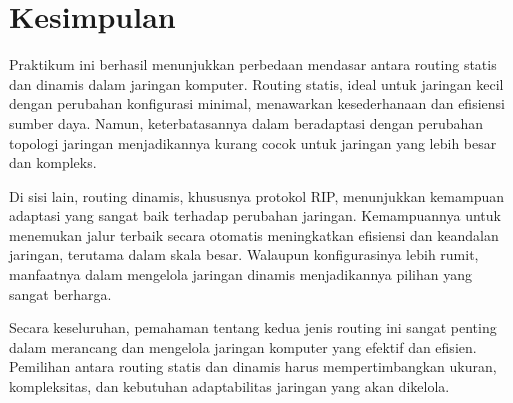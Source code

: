 \section*{Kesimpulan}

Praktikum ini berhasil menunjukkan perbedaan mendasar antara routing statis dan dinamis dalam jaringan komputer. Routing statis, ideal untuk jaringan kecil dengan perubahan konfigurasi minimal, menawarkan kesederhanaan dan efisiensi sumber daya. Namun, keterbatasannya dalam beradaptasi dengan perubahan topologi jaringan menjadikannya kurang cocok untuk jaringan yang lebih besar dan kompleks.

Di sisi lain, routing dinamis, khususnya protokol RIP, menunjukkan kemampuan adaptasi yang sangat baik terhadap perubahan jaringan. Kemampuannya untuk menemukan jalur terbaik secara otomatis meningkatkan efisiensi dan keandalan jaringan, terutama dalam skala besar. Walaupun konfigurasinya lebih rumit, manfaatnya dalam mengelola jaringan dinamis menjadikannya pilihan yang sangat berharga.

Secara keseluruhan, pemahaman tentang kedua jenis routing ini sangat penting dalam merancang dan mengelola jaringan komputer yang efektif dan efisien. Pemilihan antara routing statis dan dinamis harus mempertimbangkan ukuran, kompleksitas, dan kebutuhan adaptabilitas jaringan yang akan dikelola.